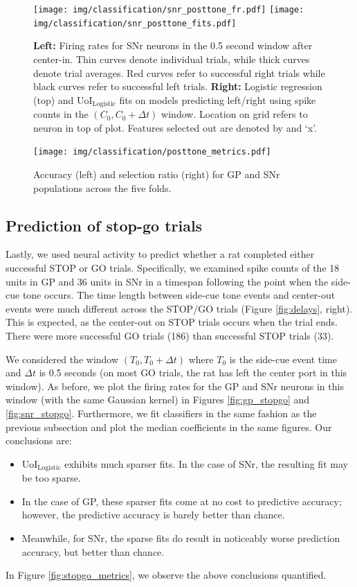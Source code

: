 \documentclass[11pt]{article}
\begin{document}
\begin{figure}[H]
	\centering
	\texttt{[image: img/classification/snr\_posttone\_fr.pdf]}
	\texttt{[image: img/classification/snr\_posttone\_fits.pdf]}
	\caption{\textbf{Left:} Firing rates for SNr neurons in the 0.5 second window after center-in. Thin curves denote individual trials, while thick curves denote trial averages. Red curves refer to successful right trials while black curves refer to successful left trials. \textbf{Right:} Logistic regression (top) and UoI$_{\text{Logistic}}$ fits on models predicting left/right using spike counts in the $(C_0, C_0+\Delta t)$ window. Location on grid refers to neuron in top of plot. Features selected out are denoted by and `x'.}
	\label{fig:snr_posttone}
\end{figure}
\begin{figure}[H]
	\centering
	\texttt{[image: img/classification/posttone\_metrics.pdf]}
	\caption{Accuracy (left) and selection ratio (right) for GP and SNr populations across the five folds.}
	\label{fig:posttone_metrics}
\end{figure}

\subsection{Prediction of stop-go trials}
Lastly, we used neural activity to predict whether a rat completed either successful STOP or GO trials. Specifically, we examined spike counts of the 18 units in GP  and 36 units in SNr in a timespan following the point when the side-cue tone occurs. The time length between side-cue tone events and center-out events were much different across the STOP/GO trials (Figure \ref{fig:delays}, right). This is expected, as the center-out on STOP trials occurs when the trial ends. There were more successful GO trials (186) than successful STOP trials (33).

We considered the window $(T_0, T_0 + \Delta t)$ where $T_0$ is the side-cue event time and $\Delta t$ is 0.5 seconds (on most GO trials, the rat has left the center port in this window). As before, we plot the firing rates for the GP and SNr neurons in this window (with the same Gaussian kernel) in Figures \ref{fig:gp_stopgo} and \ref{fig:snr_stopgo}. Furthermore, we fit classifiers in the same fashion as the previous subsection and plot the median coefficients in the same figures. Our conclusions are:
\begin{itemize}
	\item  UoI$_{\text{Logistic}}$ exhibits much sparser fits. In the case of SNr, the resulting fit may be too sparse.
	\item In the case of GP, these sparser fits come at no cost to predictive accuracy; however, the predictive accuracy is barely better than chance.
	\item Meanwhile, for SNr, the sparse fits do result in noticeably worse prediction accuracy, but better than chance.
\end{itemize}
In Figure \ref{fig:stopgo_metrics}, we observe the above conclusions quantified.
\end{document}
